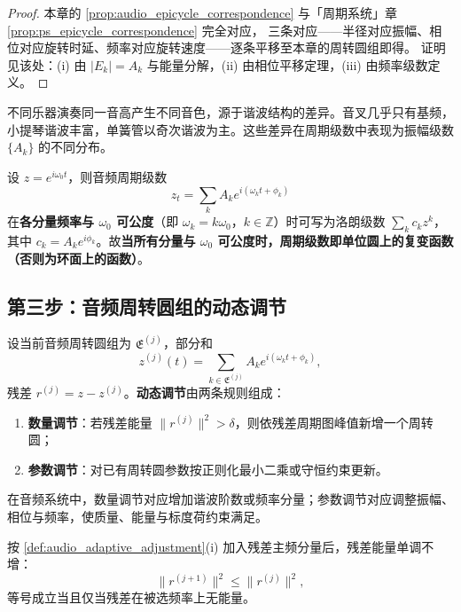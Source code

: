 \begin{proof}
本章的 \cref{prop:audio_epicycle_correspondence} 与「周期系统」章 \cref{prop:ps_epicycle_correspondence} 完全对应，
三条对应——半径对应振幅、相位对应旋转时延、频率对应旋转速度——逐条平移至本章的周转圆组即得。
证明见该处：(i) 由 $|E_k|=A_k$ 与能量分解，(ii) 由相位平移定理，(iii) 由频率级数定义。
\end{proof}

\begin{example}[乐器音色的周期级数]\label{ex:audio_timbre_series}
不同乐器演奏同一音高产生不同音色，源于谐波结构的差异。音叉几乎只有基频，小提琴谐波丰富，单簧管以奇次谐波为主。这些差异在周期级数中表现为振幅级数 $\{A_k\}$ 的不同分布。
\end{example}

\begin{remark}[周期级数即复变函数]\label{rem:audio_series_complex}
设 $z=e^{i\omega_0t}$，则音频周期级数
\[
z_t=\sum_k A_k e^{i(\omega_k t+\phi_k)}
\]
在\textbf{各分量频率与 $\omega_0$ 可公度}（即 $\omega_k=k\omega_0$，$k\in\mathbb Z$）时可写为洛朗级数 $\sum_k c_k z^k$，其中 $c_k=A_k e^{i\phi_k}$。故\textbf{当所有分量与 $\omega_0$ 可公度时，周期级数即单位圆上的复变函数（否则为环面上的函数）}。
\end{remark}

\subsection{第三步：音频周转圆组的动态调节}

\begin{definition}[音频周转圆组的动态调节]\label{def:audio_adaptive_adjustment}
设当前音频周转圆组为 $\mathfrak E^{(j)}$，部分和
\[
z^{(j)}(t)=\sum_{k\in\mathfrak E^{(j)}}A_k e^{i(\omega_k t+\phi_k)},
\]
残差 $r^{(j)}=z-z^{(j)}$。\textbf{动态调节}由两条规则组成：
\begin{enumerate}[label=(\roman*)]
    \item \textbf{数量调节}：若残差能量 $\|r^{(j)}\|^2>\delta$，则依残差周期图峰值新增一个周转圆；
    \item \textbf{参数调节}：对已有周转圆参数按正则化最小二乘或守恒约束更新。
\end{enumerate}
在音频系统中，数量调节对应增加谐波阶数或频率分量；参数调节对应调整振幅、相位与频率，使质量、能量与标度荷约束满足。
\end{definition}

\begin{proposition}[数量调节的单调性]\label{prop:audio_adaptive_growth}
按 \cref{def:audio_adaptive_adjustment}(i) 加入残差主频分量后，残差能量单调不增：
\[
\|r^{(j+1)}\|^2\le\|r^{(j)}\|^2,
\]
等号成立当且仅当残差在被选频率上无能量。
\end{proposition}

